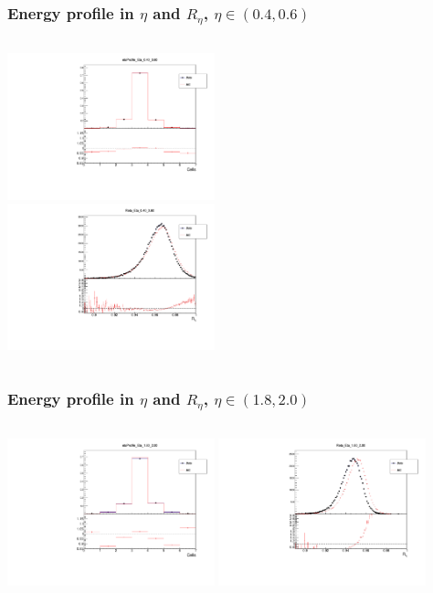 \documentclass{beamer}
\begin{document}
\begin{frame}
\frametitle{Energy profile in $\eta$ and $R_\eta$, $\eta \in (0.4, 0.6)$ }

\begin{columns}[t]
\centering
\includegraphics[width=6cm]{etaProfile2_Eta_4_6.pdf}\\
\centering
\includegraphics[width=6cm]{Reta2_Eta_4_6.pdf}\\

\end{columns}
\end{frame}
\begin{frame}
\frametitle{Energy profile in $\eta$ and $R_\eta$, $\eta \in (1.8, 2.0)$}

\begin{columns}[t]
\centering
\includegraphics[width=6cm]{etaProfile2_Eta_18_20.pdf}
\centering
\includegraphics[width=6cm]{Reta2_Eta_18_20.pdf}
\end{columns}
\end{frame}
\end{document}
